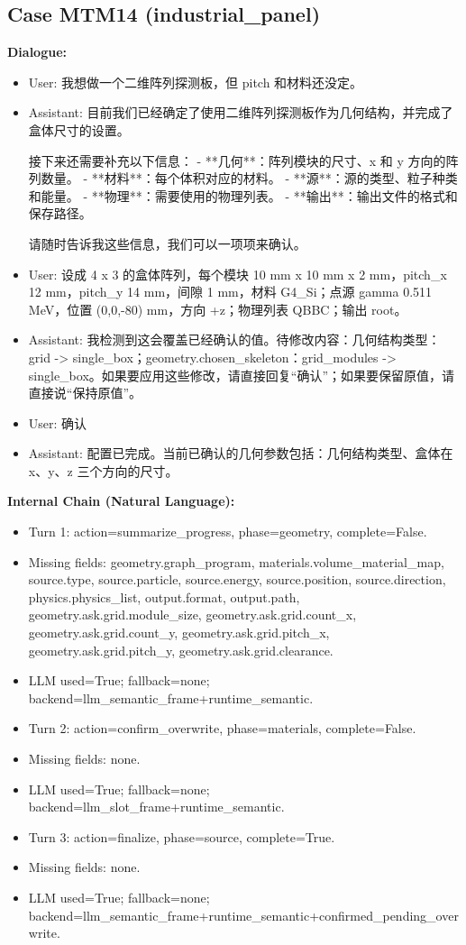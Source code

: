 \documentclass[11pt]{ctexart}
\begin{document}
\subsection{Case MTM14 (industrial\_panel)}
\textbf{Dialogue:}
\begin{itemize}
\item User: 我想做一个二维阵列探测板，但 pitch 和材料还没定。
\item Assistant: 目前我们已经确定了使用二维阵列探测板作为几何结构，并完成了盒体尺寸的设置。

接下来还需要补充以下信息：
- **几何**：阵列模块的尺寸、x 和 y 方向的阵列数量。
- **材料**：每个体积对应的材料。
- **源**：源的类型、粒子种类和能量。
- **物理**：需要使用的物理列表。
- **输出**：输出文件的格式和保存路径。

请随时告诉我这些信息，我们可以一项项来确认。
\item User: 设成 4 x 3 的盒体阵列，每个模块 10 mm x 10 mm x 2 mm，pitch\_x 12 mm，pitch\_y 14 mm，间隙 1 mm，材料 G4\_Si；点源 gamma 0.511 MeV，位置 (0,0,-80) mm，方向 +z；物理列表 QBBC；输出 root。
\item Assistant: 我检测到这会覆盖已经确认的值。待修改内容：几何结构类型：grid -> single\_box；geometry.chosen\_skeleton：grid\_modules -> single\_box。如果要应用这些修改，请直接回复“确认”；如果要保留原值，请直接说“保持原值”。
\item User: 确认
\item Assistant: 配置已完成。当前已确认的几何参数包括：几何结构类型、盒体在 x、y、z 三个方向的尺寸。
\end{itemize}
\textbf{Internal Chain (Natural Language):}
\begin{itemize}
\item Turn 1: action=summarize\_progress, phase=geometry, complete=False.
\item Missing fields: geometry.graph\_program, materials.volume\_material\_map, source.type, source.particle, source.energy, source.position, source.direction, physics.physics\_list, output.format, output.path, geometry.ask.grid.module\_size, geometry.ask.grid.count\_x, geometry.ask.grid.count\_y, geometry.ask.grid.pitch\_x, geometry.ask.grid.pitch\_y, geometry.ask.grid.clearance.
\item LLM used=True; fallback=none; backend=llm\_semantic\_frame+runtime\_semantic.
\item Turn 2: action=confirm\_overwrite, phase=materials, complete=False.
\item Missing fields: none.
\item LLM used=True; fallback=none; backend=llm\_slot\_frame+runtime\_semantic.
\item Turn 3: action=finalize, phase=source, complete=True.
\item Missing fields: none.
\item LLM used=True; fallback=none; backend=llm\_semantic\_frame+runtime\_semantic+confirmed\_pending\_overwrite.
\end{itemize}
\end{document}
